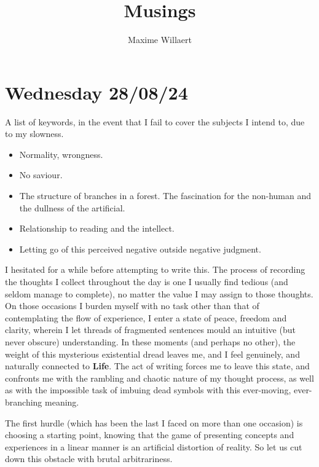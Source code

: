 \documentclass[a4paper,12pt,parskip=half*,chapterprefix=true,numbers=noendperiod]{scrreprt}
\title{Musings}
\author{Maxime Willaert}
\theoremstyle{definition}
\theoremstyle{remark}
\begin{document}
\maketitle

\tableofcontents

\section{Wednesday 28/08/24}

A list of keywords, in the event that I fail to cover the subjects I intend to, due to my slowness.
\begin{itemize}
	\item Normality, wrongness.
	\item No saviour.
	\item The structure of branches in a forest. The fascination for the non-human and the dullness of the artificial.
	\item Relationship to reading and the intellect.
	\item Letting go of this perceived negative outside negative judgment.
\end{itemize}

I hesitated for a while before attempting to write this. The process of recording the thoughts I collect throughout the day is one I usually find tedious (and seldom manage to complete), no matter the value I may assign to those thoughts. On those occasions I burden myself with no task other than that of contemplating the flow of experience, I enter a state of peace, freedom and clarity, wherein I let threads of fragmented sentences mould an intuitive (but never obscure) understanding. In these moments (and perhaps no other), the weight of this mysterious existential dread leaves me, and I feel genuinely, and naturally connected to \textbf{Life}. The act of writing forces me to leave this state, and confronts me with the rambling and chaotic nature of my thought process, as well as with the impossible task of imbuing dead symbols with this ever-moving, ever-branching meaning.

The first hurdle (which has been the last I faced on more than one occasion) is choosing a starting point, knowing that the game of presenting concepts and experiences in a linear manner is an artificial distortion of reality. So let us cut down this obstacle with brutal arbitrariness.
\end{document}
